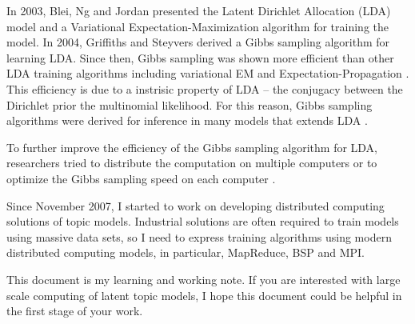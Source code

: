 
In 2003, Blei, Ng and Jordan \cite{lda_vem} presented the Latent
Dirichlet Allocation (LDA) model and a Variational
Expectation-Maximization algorithm for training the model.  In 2004,
Griffiths and Steyvers \cite{lda_gibbs} derived a Gibbs sampling
algorithm for learning LDA.  Since then, Gibbs sampling was shown more
efficient than other LDA training algorithms including variational EM
and Expectation-Propagation \cite{ep-lda}.  This efficiency is due to
a instrisic property of LDA -- the conjugacy between the Dirichlet
prior the multinomial likelihood.  For this reason, Gibbs sampling
algorithms were derived for inference in many models that extends LDA
\cite{tot} \cite{rart} \cite{hlda} \cite{slda} \cite{pam}.

To further improve the efficiency of the Gibbs sampling algorithm for
LDA, researchers tried to distribute the computation on multiple
computers \cite{dist-lda-gibbs} or to optimize the Gibbs sampling
speed on each computer \cite{fastlda}.

Since November 2007, I started to work on developing distributed
computing solutions of topic models.  Industrial solutions are often
required to train models using massive data sets, so I need to express
training algorithms using modern distributed computing models, in
particular, MapReduce, BSP and MPI.

This document is my learning and working note.  If you are interested
with large scale computing of latent topic models, I hope this
document could be helpful in the first stage of your work.

